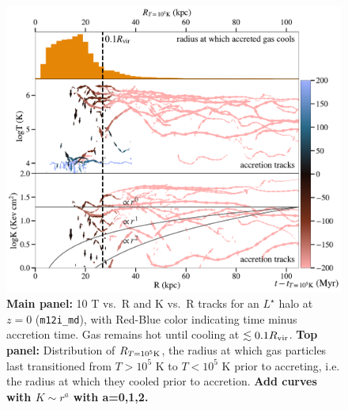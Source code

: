 \documentclass[fleqn,usenatbib]{mnras}
\newcommand{\Rcool}{R_{T=10^5 {\rm K}}}
\begin{document}
\begin{figure}
    \centering
    \includegraphics[width=\columnwidth]{figures/tracks_m12i_md.pdf}
    \caption{
    \textbf{Main panel:} 10 T vs.\ R and K vs.\ R tracks for an $L^\star$ halo at $z=0$ (\texttt{m12i\_md}), with Red-Blue color indicating time minus accretion time.
    Gas remains hot until cooling at $\lesssim 0.1 R_{\rm vir}$.
    \textbf{Top panel:} Distribution of $\Rcool$, the radius at which gas particles last transitioned from $T > 10^5$ K to $T < 10^5$ K prior to accreting, i.e. the radius at which they cooled prior to accretion.
    \textbf{Add curves with $K \sim r^a$ with a=0,1,2.}
    }
    \label{f: T vs R}
\end{figure}

\end{document}
